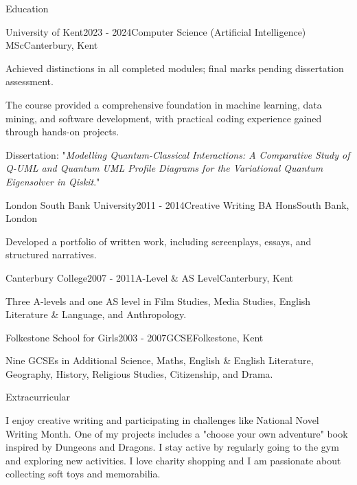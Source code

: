 \documentclass[
	11pt, %
]{resume} %
\begin{document}
\begin{rSection}{Education}

\begin{rSubsection}{University of Kent}{2023 - 2024}{Computer Science (Artificial Intelligence) MSc}{Canterbury, Kent}
    \item Achieved distinctions in all completed modules; final marks pending dissertation assessment. 
    \item The course provided a comprehensive foundation in machine learning, data mining, and software development, with practical coding experience gained through hands-on projects.
    \item Dissertation: "\textit{Modelling Quantum-Classical Interactions: A Comparative Study of Q-UML and Quantum UML Profile Diagrams for the Variational Quantum Eigensolver in Qiskit}."
\end{rSubsection}

\begin{rSubsection}{London South Bank University}{2011 - 2014}{Creative Writing BA Hons}{South Bank, London}
    \item Developed a portfolio of written work, including screenplays, essays, and structured narratives.
\end{rSubsection}

\begin{rSubsection}{Canterbury College}{2007 - 2011}{A-Level \& AS Level}{Canterbury, Kent}
    \item Three A-levels and one AS level in Film Studies, Media Studies, English Literature \& Language, and Anthropology.
\end{rSubsection}

\begin{rSubsection}{Folkestone School for Girls}{2003 - 2007}{GCSE}{Folkestone, Kent}
    \item Nine GCSEs in Additional Science, Maths, English \& English Literature, Geography, History, Religious Studies, Citizenship, and Drama.
\end{rSubsection}

\end{rSection}


\begin{rSection}{Extracurricular}

I enjoy creative writing and participating in challenges like National Novel Writing Month. One of my projects includes a "choose your own adventure" book inspired by Dungeons and Dragons. I stay active by regularly going to the gym and exploring new activities. I love charity shopping and I am passionate about collecting soft toys and memorabilia. 

\end{rSection}
\end{document}
